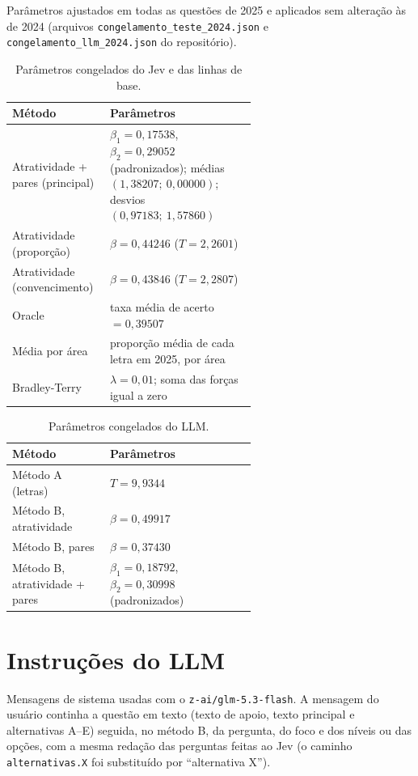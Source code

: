 Parâmetros ajustados em todas as questões de 2025 e aplicados sem alteração às de 2024 (arquivos \texttt{congelamento\_teste\_2024.json} e \texttt{congelamento\_llm\_2024.json} do repositório).

\begin{table}[ht]
\centering
\small
\caption{Parâmetros congelados do Jev e das linhas de base.}
\begin{tabular}{@{}l>{\raggedright\arraybackslash}p{0.6\linewidth}@{}}
\toprule
Método & Parâmetros \\
\midrule
Atratividade + pares (principal) & $\beta_1 = 0{,}17538$, $\beta_2 = 0{,}29052$ (padronizados); médias $(1{,}38207;\ 0{,}00000)$; desvios $(0{,}97183;\ 1{,}57860)$ \\
Atratividade (proporção) & $\beta = 0{,}44246$ ($T = 2{,}2601$) \\
Atratividade (convencimento) & $\beta = 0{,}43846$ ($T = 2{,}2807$) \\
Oracle & taxa média de acerto $= 0{,}39507$ \\
Média por área & proporção média de cada letra em 2025, por área \\
Bradley-Terry & $\lambda = 0{,}01$; soma das forças igual a zero \\
\bottomrule
\end{tabular}
\end{table}

\begin{table}[ht]
\centering
\small
\caption{Parâmetros congelados do LLM.}
\begin{tabular}{@{}l>{\raggedright\arraybackslash}p{0.6\linewidth}@{}}
\toprule
Método & Parâmetros \\
\midrule
Método A (letras) & $T = 9{,}9344$ \\
Método B, atratividade & $\beta = 0{,}49917$ \\
Método B, pares & $\beta = 0{,}37430$ \\
Método B, atratividade + pares & $\beta_1 = 0{,}18792$, $\beta_2 = 0{,}30998$ (padronizados) \\
\bottomrule
\end{tabular}
\end{table}

\section{Instruções do LLM}\label{ap:llm}

Mensagens de sistema usadas com o \texttt{z-ai/glm-5.3-flash}. A mensagem do usuário continha a questão em texto (texto de apoio, texto principal e alternativas A--E) seguida, no método B, da pergunta, do foco e dos níveis ou das opções, com a mesma redação das perguntas feitas ao Jev (o caminho \texttt{alternativas.X} foi substituído por ``alternativa X'').

